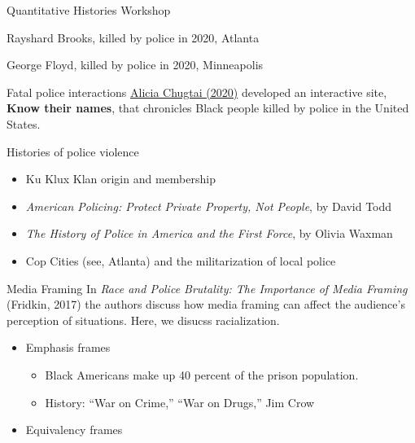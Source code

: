 \documentclass[
  ignorenonframetext,
]{beamer}
\begin{document}
\begin{frame}[fragile]{Quantitative Histories Workshop}
\begin{block}{}
\protect\hypertarget{section-5}{}
Rayshard Brooks, killed by police in 2020, Atlanta
\end{block}

\begin{block}{}
\protect\hypertarget{section-6}{}
George Floyd, killed by police in 2020, Minneapolis
\end{block}

\begin{block}{Fatal police interactions}
\protect\hypertarget{fatal-police-interactions}{}
\href{https://interactive.aljazeera.com/aje/2020/know-their-names/index.html}{Alicia
Chugtai (2020)} developed an interactive site, \textbf{Know their
names}, that chronicles Black people killed by police in the United
States.
\end{block}

\begin{block}{Histories of police violence}
\protect\hypertarget{histories-of-police-violence}{}
\begin{itemize}
\item
  Ku Klux Klan origin and membership
\item
  \emph{American Policing: Protect Private Property, Not People}, by
  David Todd
\item
  \emph{The History of Police in America and the First Force}, by Olivia
  Waxman
\item
  Cop Cities (see, Atlanta) and the militarization of local police
\end{itemize}
\end{block}

\begin{block}{Media Framing}
\protect\hypertarget{media-framing}{}
In \emph{Race and Police Brutality: The Importance of Media Framing}
(Fridkin, 2017) the authors discuss how media framing can affect the
audience's perception of situations. Here, we disucss racialization.

\begin{itemize}[<+->]
\item
  {Emphasis frames}

  \begin{itemize}[<+->]
  \item
    Black Americans make up 40 percent of the prison population.
  \item
    History: ``War on Crime,'' ``War on Drugs,'' Jim Crow
  \end{itemize}
\item
  {Equivalency frames}


\end{itemize}
\end{block}
\end{frame}
\end{document}
